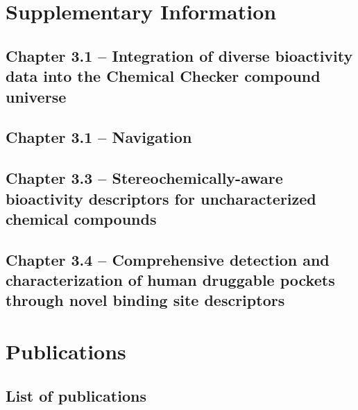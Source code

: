 \titleformat{\section}[block]
  {\normalfont\LARGE\bfseries}{\thesection}{1em}{}


\chapter{Supplementary Information}
\newpage


\clearpage
\section{Chapter 3.1 -- Integration of diverse bioactivity data into the Chemical Checker compound universe}




\clearpage
\section{Chapter 3.1 -- Navigation}



\clearpage
\section{Chapter 3.3 -- Stereochemically-aware bioactivity descriptors for uncharacterized chemical compounds}


\clearpage
\section{Chapter 3.4 -- Comprehensive detection and characterization of human druggable pockets through novel binding site descriptors}




\chapter{Publications}
\newpage
\section{List of publications}

